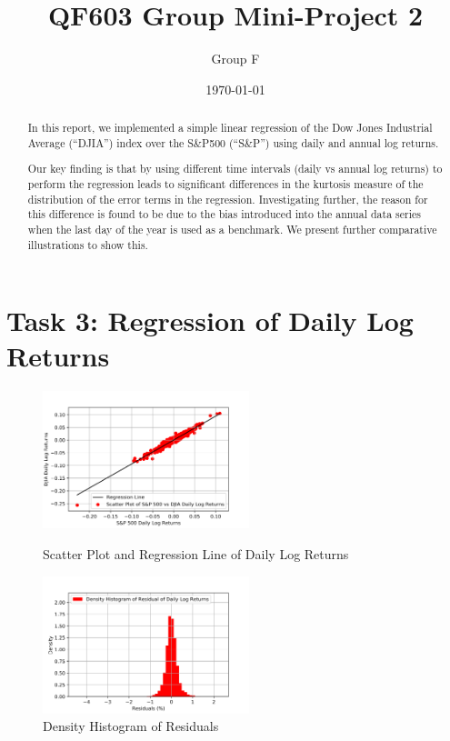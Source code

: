 \documentclass[a4paper]{article}
\title{QF603 Group Mini-Project 2}
\author{Group F}
\date{\today}
\begin{document}
	\maketitle
	
	\begin{abstract}
		In this report, we implemented a simple linear regression of the Dow Jones Industrial Average (“DJIA”) index over the S\&P500 (“S\&P”) using daily and annual log returns.
				
	\vspace{6pt} 
	
		Our key finding is that by using different time intervals (daily vs annual log returns) to perform the regression leads to significant differences in the kurtosis measure of the distribution of the error terms in the regression. Investigating further, the reason for this difference is found to be due to the bias introduced into the annual data series when the last day of the year is used as a benchmark. We present further comparative illustrations to show this. 
		
		 	
	\end{abstract} 
	
	\newpage
	\setcounter{secnumdepth}{1}
	\section*{Task 3: Regression of Daily Log Returns}
	\label{sec:introduction}
	
	\begin{figure}[htbp]
		\centering
		\begin{minipage}[t]{0.48\textwidth}
			\centering
			\includegraphics[width=6cm]{Daily_Scatter.png}
			\captionsetup{font=small}
			\caption{Scatter Plot and Regression Line of Daily Log Returns}
		\end{minipage}
		\begin{minipage}[t]{0.48\textwidth}
			\centering
			\includegraphics[width=6cm]{Daily_Hist.png}
			\captionsetup{font=small}
			\caption{Density Histogram of Residuals}
		\end{minipage}
	\end{figure}
	
\end{document}
